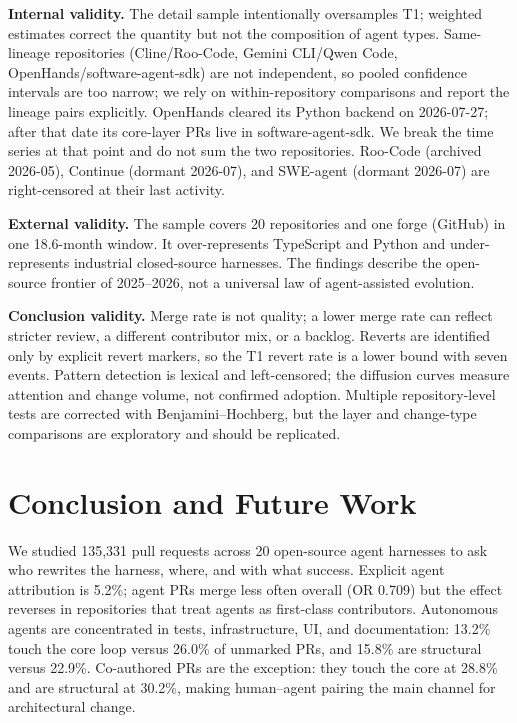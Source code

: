\documentclass[sigconf,review]{acmart}
\begin{document}
\textbf{Internal validity.} The detail sample intentionally oversamples T1; weighted estimates correct the quantity but not the composition of agent types. Same-lineage repositories (Cline/Roo-Code, Gemini CLI/Qwen Code, OpenHands/software-agent-sdk) are not independent, so pooled confidence intervals are too narrow; we rely on within-repository comparisons and report the lineage pairs explicitly. OpenHands cleared its Python backend on 2026-07-27; after that date its core-layer PRs live in software-agent-sdk. We break the time series at that point and do not sum the two repositories. Roo-Code (archived 2026-05), Continue (dormant 2026-07), and SWE-agent (dormant 2026-07) are right-censored at their last activity.

\textbf{External validity.} The sample covers 20 repositories and one forge (GitHub) in one 18.6-month window. It over-represents TypeScript and Python and under-represents industrial closed-source harnesses. The findings describe the open-source frontier of 2025--2026, not a universal law of agent-assisted evolution.

\textbf{Conclusion validity.} Merge rate is not quality; a lower merge rate can reflect stricter review, a different contributor mix, or a backlog. Reverts are identified only by explicit revert markers, so the T1 revert rate is a lower bound with seven events. Pattern detection is lexical and left-censored; the diffusion curves measure attention and change volume, not confirmed adoption. Multiple repository-level tests are corrected with Benjamini--Hochberg, but the layer and change-type comparisons are exploratory and should be replicated.

\section{Conclusion and Future Work}
\label{sec:conclusion}

We studied 135,331 pull requests across 20 open-source agent harnesses to ask who rewrites the harness, where, and with what success. Explicit agent attribution is 5.2\%; agent PRs merge less often overall (OR 0.709) but the effect reverses in repositories that treat agents as first-class contributors. Autonomous agents are concentrated in tests, infrastructure, UI, and documentation: 13.2\% touch the core loop versus 26.0\% of unmarked PRs, and 15.8\% are structural versus 22.9\%. Co-authored PRs are the exception: they touch the core at 28.8\% and are structural at 30.2\%, making human--agent pairing the main channel for architectural change.
\end{document}
